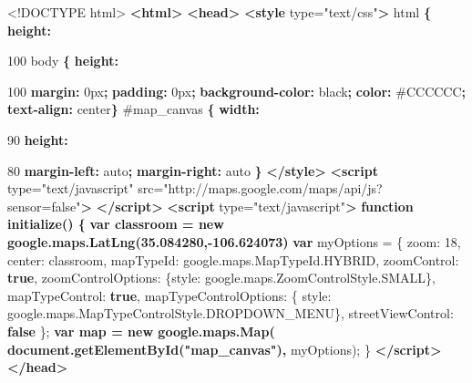 \documentclass[]{article}
\newenvironment{Shaded}{}{}
\newcommand{\KeywordTok}[1]{\textcolor[rgb]{0.00,0.44,0.13}{\textbf{{#1}}}}
\newcommand{\DataTypeTok}[1]{\textcolor[rgb]{0.56,0.13,0.00}{{#1}}}
\newcommand{\DecValTok}[1]{\textcolor[rgb]{0.25,0.63,0.44}{{#1}}}
\newcommand{\FloatTok}[1]{\textcolor[rgb]{0.25,0.63,0.44}{{#1}}}
\newcommand{\StringTok}[1]{\textcolor[rgb]{0.25,0.44,0.63}{{#1}}}
\newcommand{\OtherTok}[1]{\textcolor[rgb]{0.00,0.44,0.13}{{#1}}}
\newcommand{\FunctionTok}[1]{\textcolor[rgb]{0.02,0.16,0.49}{{#1}}}
\newcommand{\ErrorTok}[1]{\textcolor[rgb]{1.00,0.00,0.00}{\textbf{{#1}}}}
\newcommand{\NormalTok}[1]{{#1}}
\begin{document}
\begin{Shaded}
\begin{Highlighting}[numbers=left,,]
\DataTypeTok{<!DOCTYPE }\NormalTok{html}\DataTypeTok{>}
\KeywordTok{<html>}
    \KeywordTok{<head>}
        \KeywordTok{<style}\OtherTok{ type=}\StringTok{"text/css"}\KeywordTok{>}
          \NormalTok{html }\KeywordTok{\{} \KeywordTok{height:} \DataTypeTok{100%
          \NormalTok{body }\KeywordTok{\{} \KeywordTok{height:} \DataTypeTok{100%
            \KeywordTok{margin:} \DataTypeTok{0px}\KeywordTok{;} 
            \KeywordTok{padding:} \DataTypeTok{0px}\KeywordTok{;} 
            \KeywordTok{background-color:} \DataTypeTok{black}\KeywordTok{;} 
            \KeywordTok{color:} \DataTypeTok{#CCCCCC}\KeywordTok{;}
            \KeywordTok{text-align:} \DataTypeTok{center}\KeywordTok{\}}
          \FloatTok{#map_canvas} \KeywordTok{\{} \KeywordTok{width:}\DataTypeTok{90%
            \KeywordTok{height:}\DataTypeTok{80%
            \KeywordTok{margin-left:} \DataTypeTok{auto}\KeywordTok{;} 
            \KeywordTok{margin-right:} \DataTypeTok{auto} \KeywordTok{\}}
        \KeywordTok{</style>}
        \KeywordTok{<script}\OtherTok{ type=}\StringTok{"text/javascript"}
\OtherTok{            src=}\StringTok{"http://maps.google.com/maps/api/js?sensor=false"}\KeywordTok{>}
        \KeywordTok{</script>}
        \KeywordTok{<script}\OtherTok{ type=}\StringTok{"text/javascript"}\KeywordTok{>}
\ErrorTok{          function initialize() \{}
\ErrorTok{            var classroom = new google.maps.LatLng(35.084280,-106.624073)}
            \KeywordTok{var} \NormalTok{myOptions = \{}
              \DataTypeTok{zoom}\NormalTok{: }\DecValTok{18}\NormalTok{,}
              \DataTypeTok{center}\NormalTok{: classroom,}
              \DataTypeTok{mapTypeId}\NormalTok{: }\OtherTok{google}\NormalTok{.}\OtherTok{maps}\NormalTok{.}\OtherTok{MapTypeId}\NormalTok{.}\FunctionTok{HYBRID}\NormalTok{,}
              \DataTypeTok{zoomControl}\NormalTok{: }\KeywordTok{true}\NormalTok{,}
              \DataTypeTok{zoomControlOptions}\NormalTok{: \{}\DataTypeTok{style}\NormalTok{: }\OtherTok{google}\NormalTok{.}\OtherTok{maps}\NormalTok{.}\OtherTok{ZoomControlStyle}\NormalTok{.}\FunctionTok{SMALL}\NormalTok{\},}
              \DataTypeTok{mapTypeControl}\NormalTok{: }\KeywordTok{true}\NormalTok{,}
              \DataTypeTok{mapTypeControlOptions}\NormalTok{: \{}
                \DataTypeTok{style}\NormalTok{: }\OtherTok{google}\NormalTok{.}\OtherTok{maps}\NormalTok{.}\OtherTok{MapTypeControlStyle}\NormalTok{.}\FunctionTok{DROPDOWN_MENU}\NormalTok{\},}
              \DataTypeTok{streetViewControl}\NormalTok{: }\KeywordTok{false}
            \NormalTok{\};}
\ErrorTok{            var map = new google.maps.Map(}
\ErrorTok{                document.getElementById("map_canvas"),}
                \NormalTok{myOptions);}
          \NormalTok{\}}
        \KeywordTok{</script>}
    \KeywordTok{</head>}

}}}}
\end{Highlighting}
\end{Shaded}
\end{document}
